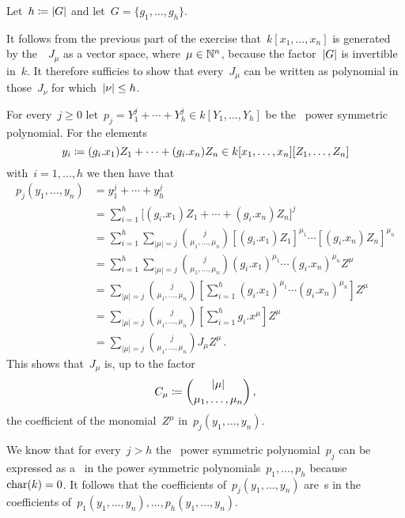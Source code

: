 Let~$h \coloneqq \lvert G\rvert$ and let~$G = \{g_1, \dotsc, g_h\}$.

It follows from the previous part of the exercise that~$k[x_1, \dotsc, x_n]$ is generated by the~~$J_\mu$ as a vector space, where~$\mu \in \mathbb{N}^n$, because the factor~$\lvert G\rvert$ is invertible in~$k$.
It therefore sufficies to show that every~$J_\mu$ can be written as polynomial in those~$J_\nu$ for which~$\lvert\nu\rvert \leq h$.
  
For every~$j \geq 0$ let~$p_j = Y_1^j + \dotsb + Y_h^j \in k[Y_1, \dotsc, Y_h]$ be the~ power symmetric polynomial.
For the elements
\[
            y_i
  \coloneqq  (g_i.x_1) Z_1 + \dotsb + (g_i.x_n) Z_n
  \in       k[x_1, \dotsc, x_n][Z_1, \dotsc, Z_n]
\]
with~$i = 1, \dotsc, h$ we then have that
\begingroup
\allowdisplaybreaks
\begin{align*}
      p_j(y_1, \dotsc, y_n)
  &=  y_1^j + \dotsb + y_h^j  \\
  &=  \sum_{i=1}^h \bigl[ (g_i.x_1) Z_1 + \dotsb + (g_i.x_n) Z_n \bigr]^j  \\
  &=  \sum_{i=1}^h \sum_{|\mu| = j}
      \binom{j}{\mu_1, \dotsc, \mu_n} [(g_i.x_1) Z_1]^{\mu_1} \dotsm [(g_i.x_n) Z_n]^{\mu_n}  \\
  &=  \sum_{i=1}^h \sum_{|\mu| = j}
      \binom{j}{\mu_1, \dotsc, \mu_n} (g_i.x_1)^{\mu_1} \dotsm (g_i.x_n)^{\mu_n} Z^\mu \\
  &=  \sum_{|\mu| = j} \binom{j}{\mu_1, \dotsc, \mu_n}
      \left[
        \sum_{i=1}^h (g_i.x_1)^{\mu_1} \dotsm (g_i.x_n)^{\mu_n}
      \right]
      Z^\mu  \\
  &=  \sum_{|\mu| = j} \binom{j}{\mu_1, \dotsc, \mu_n}
      \left[
        \sum_{i=1}^h g_i.x^\mu
      \right]
      Z^\mu  \\
  &=  \sum_{|\mu| = j} \binom{j}{\mu_1, \dotsc, \mu_n} J_\mu Z^\mu \,.
\end{align*}
\endgroup
This shows that~$J_\mu$ is, up to the factor
\[
            C_\mu
  \coloneqq  \binom{|\mu|}{\mu_1, \dotsc, \mu_n} \,,
\]
the coefficient of the monomial~$Z^\mu$ in~$p_j(y_1, \dotsc, y_n)$.

We know that for every~$j > h$ the~ power symmetric polynomial~$p_j$ can be expressed as a~ in the power symmetric polynomials~$p_1, \dotsc, p_h$ because~$\operatorname{char}(k) = 0$.
It follows that the coefficients of~$p_j(y_1, \dotsc, y_n)$ are~s in the coefficients of~$p_1(y_1, \dotsc, y_n), \dotsc, p_h(y_1, \dotsc, y_n)$.

